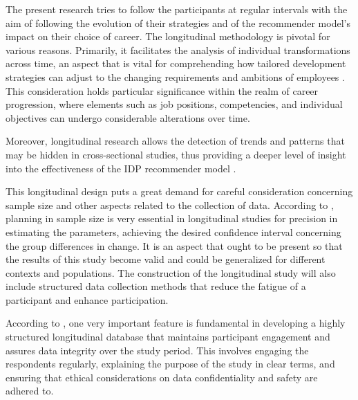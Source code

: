 The present research tries to follow the participants at regular intervals with the aim of following the evolution of their strategies and of the recommender model's impact on their choice of career. The longitudinal methodology is pivotal for various reasons. Primarily, it facilitates the analysis of individual transformations across time, an aspect that is vital for comprehending how tailored development strategies can adjust to the changing requirements and ambitions of employees \cite{jung2023longitudinal}. This consideration holds particular significance within the realm of career progression, where elements such as job positions, competencies, and individual objectives can undergo considerable alterations over time.


Moreover, longitudinal research allows the detection of trends and patterns that may be hidden in cross-sectional studies, thus providing a deeper level of insight into the effectiveness of the IDP recommender model \cite{kelley2011sample}.


This longitudinal design puts a great demand for careful consideration concerning sample size and other aspects related to the collection of data. According to \cite{kelley2011sample}, planning in sample size is very essential in longitudinal studies for precision in estimating the parameters, achieving the desired confidence interval concerning the group differences in change. It is an aspect that ought to be present so that the results of this study become valid and could be generalized for different contexts and populations. The construction of the longitudinal study will also include structured data collection methods that reduce the fatigue of a participant and enhance participation.


According to \cite{jung2023longitudinal}, one very important feature is fundamental in developing a highly structured longitudinal database that maintains participant engagement and assures data integrity over the study period. This involves engaging the respondents regularly, explaining the purpose of the study in clear terms, and ensuring that ethical considerations on data confidentiality and safety are adhered to.
